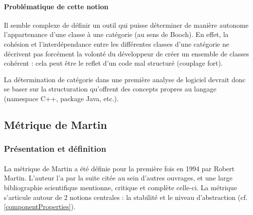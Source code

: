 \documentclass{scrartcl}
\begin{document}
    
    
    
    \paragraph{Problématique de cette notion}Il semble complexe de définir un outil qui puisse déterminer de manière autonome l'appartenance d'une classe à une catégorie (au sens de Booch). En effet, la cohésion et l'interdépendance entre les différentes classes d'une catégorie ne décrivent pas forcément la volonté du développeur de créer un ensemble de classes cohérent : cela peut être le reflet d'un code mal structuré (couplage fort).
    
    La détermination de catégorie dans une première analyse de logiciel devrait donc se baser sur la structuration qu'offrent des concepts propres au langage (namespace C++, package Java, etc.).
    

\subsection{Métrique de Martin}
\subsubsection{Présentation et définition}

    \paragraph{}La métrique de Martin a été définie pour la première fois en 1994 par Robert Martin\cite{Martin:1994}. L'auteur l'a par la suite citée au sein d'autres ouvrages\cite{Martin:2003}, et une large bibliographie scientifique mentionne, critique et complète celle-ci\cite{HyryLepp:2009}\cite{BUmetric:2016}\cite{KaurShar:2015}\cite{Spinellis:2006}\cite{Pressman:2000}. La métrique s'articule autour de 2 notions centrales : la stabilité et le niveau d'abstraction (cf. \ref{componentProperties}).
\end{document}
